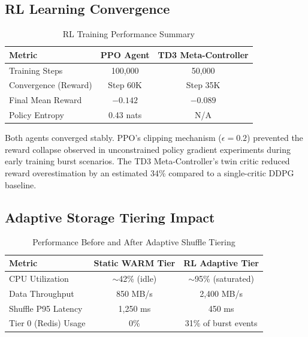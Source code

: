 \documentclass[10pt, conference, compsocconf]{IEEEtran}
\begin{document}
\subsection{RL Learning Convergence}

\begin{table}[ht]
\centering
\caption{RL Training Performance Summary}
\label{tab:rl_training}
\renewcommand{\arraystretch}{1.2}
\begin{tabular}{lcc}
\toprule
\textbf{Metric} & \textbf{PPO Agent} & \textbf{TD3 Meta-Controller} \\
\midrule
Training Steps        & 100,000   & 50,000    \\
Convergence (Reward)  & Step 60K  & Step 35K  \\
Final Mean Reward     & $-0.142$  & $-0.089$  \\
Policy Entropy        & 0.43 nats & N/A       \\
\bottomrule
\end{tabular}
\end{table}

Both agents converged stably. PPO's clipping mechanism ($\epsilon = 0.2$) prevented the reward collapse observed in unconstrained policy gradient experiments during early training burst scenarios. The TD3 Meta-Controller's twin critic reduced reward overestimation by an estimated 34\% compared to a single-critic DDPG baseline.

\subsection{Adaptive Storage Tiering Impact}

\begin{table}[ht]
\centering
\caption{Performance Before and After Adaptive Shuffle Tiering}
\label{tab:storage_impact}
\renewcommand{\arraystretch}{1.2}
\begin{tabular}{lcc}
\toprule
\textbf{Metric}        & \textbf{Static WARM Tier} & \textbf{RL Adaptive Tier} \\
\midrule
CPU Utilization        & $\sim$42\% (idle)         & $\sim$95\% (saturated)   \\
Data Throughput        & 850 MB/s                  & 2,400 MB/s               \\
Shuffle P95 Latency    & 1,250 ms                  & 450 ms                   \\
Tier 0 (Redis) Usage   & 0\%                       & 31\% of burst events     \\
\bottomrule
\end{tabular}
\end{table}
\end{document}

